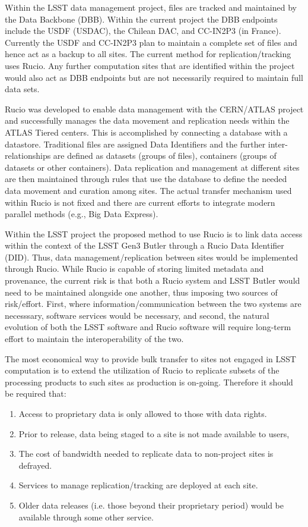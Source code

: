 Within the LSST data management project, files are tracked and maintained by the Data Backbone (DBB).
Within the current project the DBB endpoints include the USDF (USDAC), the Chilean DAC, and 
CC-IN2P3 (in France).  Currently the USDF and CC-IN2P3 plan to maintain a complete set of files 
and hence act as a backup to all sites.  The current method for replication/tracking uses Rucio.
Any further computation sites that are identified within the project would also act as DBB endpoints
but are not necessarily required to maintain full data sets.

Rucio was developed to enable data management with the CERN/ATLAS project and successfully 
manages the data movement and replication needs within the ATLAS Tiered centers.  This is 
accomplished by connecting a database with a datastore.  Traditional files are assigned 
Data Identifiers and the further inter-relationships are defined as datasets (groups of 
files), containers (groups of datasets or other containers).   Data replication and management 
at different sites are then maintained through rules that use the database to define the needed
data movement and curation among sites.  The actual transfer mechanism used within Rucio 
is not fixed and there are current efforts to integrate modern parallel methods 
(e.g., Big Data Express).  

Within the LSST project the proposed method to use Rucio is to link data access within the context 
of the LSST Gen3 Butler through a Rucio Data Identifier (DID).  Thus, data management/replication 
between sites would be implemented through Rucio.  While Rucio is capable of storing limited metadata 
and provenance, the current risk is that both a Rucio system and LSST Butler would need to be 
maintained alongside one another, thus imposing two sources of risk/effort.  First, where 
information/communication between the two systems are necesssary, software services would be 
necessary, and second, the natural evolution of both the LSST software and Rucio software will 
require long-term effort to maintain the interoperability of the two.

The most economical way to provide bulk transfer to sites not engaged in LSST computation is to 
extend the utilization of Rucio to replicate subsets of the processing products to such sites as 
production is on-going.  Therefore it should be required that:
\begin{enumerate}
\item Access to proprietary data is only allowed to those with data rights.
\item Prior to release, data being staged to a site is not made available to users,
\item The cost of bandwidth needed to replicate data to non-project sites is defrayed.
\item Services to manage replication/tracking are deployed at each site.
\item Older data releases (i.e. those beyond their proprietary period) would be available through some other service.
\end{enumerate}

